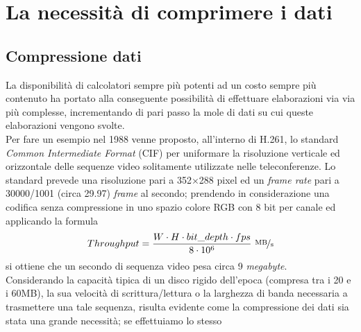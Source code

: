 
\chapter{La necessità di comprimere i dati} %

\label{Chapter3}



\section{Compressione dati}
La disponibilità di calcolatori sempre più potenti ad un costo sempre più
contenuto ha portato alla conseguente possibilità di effettuare elaborazioni
via via più complesse, incrementando di pari passo la mole di dati su cui
queste elaborazioni vengono svolte. \\
Per fare un esempio nel 1988 venne proposto, all'interno di H.261, lo standard
\emph{Common Intermediate Format} (CIF) per uniformare la risoluzione verticale
ed orizzontale delle sequenze video solitamente utilizzate nelle teleconferenze.
Lo standard prevede una risoluzione pari a 352${\times}$288 pixel ed un
\emph{frame rate} pari a 30000/1001 (circa 29.97) \emph{frame} al secondo;
prendendo in considerazione una codifica senza compressione in uno spazio
colore RGB con 8 bit per canale ed applicando la formula
\begin{align*}
  \displaystyle Throughput = \frac{
  W \cdot H \cdot bit\_depth \cdot fps}{8\cdot10^6} 
  \ \nicefrac{\text{MB}}{\text{s}}
\end{align*}%
si ottiene che un secondo di sequenza video pesa circa 9 \emph{megabyte}. \\
Considerando la capacità tipica di un disco rigido dell'epoca (compresa
tra i 20 e i 60MB), la sua velocità di scrittura/lettura o la larghezza di 
banda necessaria a trasmettere una tale sequenza, risulta evidente come la 
compressione dei dati sia stata una grande necessità; se effettuiamo lo stesso 
